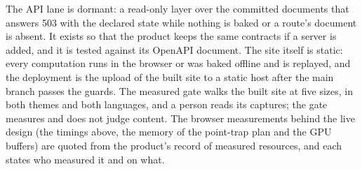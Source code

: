 The API lane is dormant: a read-only layer over the committed documents that answers 503 with the declared state while nothing is baked or a route's document is absent. It exists so that the product keeps the same contracts if a server is added, and it is tested against its OpenAPI document. The site itself is static: every computation runs in the browser or was baked offline and is replayed, and the deployment is the upload of the built site to a static host after the main branch passes the guards. The measured gate walks the built site at five sizes, in both themes and both languages, and a person reads its captures; the gate measures and does not judge content. The browser measurements behind the live design (the timings above, the memory of the point-trap plan and the GPU buffers) are quoted from the product's record of measured resources, and each states who measured it and on what.
